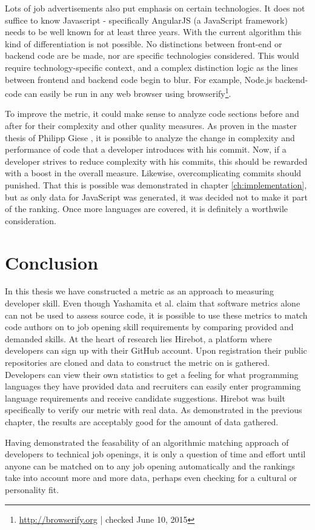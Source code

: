 Lots of job advertisements also put emphasis on certain technologies.
It does not suffice to know Javascript - specifically AngularJS (a JavaScript framework)
needs to be well known for at least three years.
With the current algorithm this kind of differentiation is not possible.
No distinctions between front-end or backend code are be made,
nor are specific technologies considered. This would require technology-specific
context, and a complex distinction logic as the lines between frontend
and backend code begin to blur. For example, Node.js backend-code can easily be run in any web browser using browserify\footnote{\url{http://browserify.org} | checked June 10, 2015}.
\newline

To improve the metric, it could make sense to analyze code sections
before and after for their complexity and other quality measures.
As proven in the master thesis of Philipp Giese \cite{pg:2014},
it is possible to analyze the change in complexity and performance
of code that a developer introduces with his commit.
Now, if a developer strives to reduce complexity with his commits,
this should be rewarded with a boost in the overall measure.
Likewise, overcomplicating commits should punished.
That this is possible was demonstrated in chapter \ref{ch:implementation},
but as only data for JavaScript was generated, it was decided not to make
it part of the ranking. Once more languages are covered, it is definitely
a worthwile consideration.

\section{Conclusion}
In this thesis we have constructed a metric as an approach to measuring developer
skill. Even though Yashamita et al. claim that software metrics alone can not
be used to assess source code\cite{mlya:2012}, it is possible to use these metrics
to match code authors on to job opening skill requirements by comparing provided and demanded skills.
At the heart of research lies Hirebot, a platform where developers can sign up with their
GitHub account. Upon registration their public repositories are cloned and
data to construct the metric on is gathered.
Developers can view their own statistics to get a feeling for what programming
languages they have provided data and recruiters can easily
enter programming language requirements and receive candidate suggestions.
Hirebot was built specifically to verify our metric with real data.
As demonstrated in the previous chapter, the results are acceptably good for
the amount of data gathered.

Having demonstrated the feasability of an algorithmic matching approach
of developers to technical job openings, it is only a question of time and effort
until anyone can be matched on to any job opening automatically and the rankings
take into account more and more data, perhaps even checking for a cultural or
personality fit.